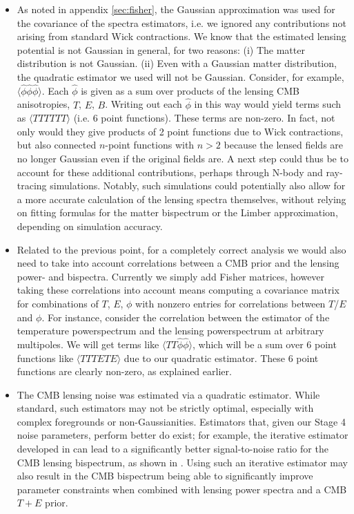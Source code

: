 \documentclass[11pt]{article} %
\begin{document}
\begin{itemize}
     \item As noted in appendix \ref{sec:fisher}, the Gaussian approximation was used for the covariance of the spectra estimators, i.e. we ignored any contributions not arising from standard Wick contractions. We know that the estimated lensing potential is not Gaussian in general, for two reasons: (i) The matter distribution is not Gaussian. (ii) Even with a Gaussian matter distribution, the quadratic estimator we used will not be Gaussian. Consider, for example, $\langle \hat \phi \hat \phi \hat \phi \rangle$. Each $\hat \phi$ is given as a sum over products of the lensing CMB anisotropies, $T$, $E$, $B$. Writing out each $\hat \phi$ in this way would yield terms such as $\langle TTTTTT\rangle$ (i.e. 6 point functions). These terms are non-zero. In fact, not only would they give products of 2 point functions due to Wick contractions, but also connected $n$-point functions with $n>2$ because the lensed fields are no longer Gaussian even if the original fields are. A next step could thus be to account for these additional contributions, perhaps through N-body and ray-tracing simulations. Notably, such simulations could potentially also allow for a more accurate calculation of the lensing spectra themselves, without relying on fitting formulas for the matter bispectrum or the Limber approximation, depending on simulation accuracy.

     \item Related to the previous point, for a completely correct analysis we would also need to take into account correlations between a CMB prior and the lensing power- and bispectra. Currently we simply add Fisher matrices, however taking these correlations into account means computing a covariance matrix for combinations of $T$, $E$, $\phi$ with nonzero entries for correlations between $T$/$E$ and $\phi$. For instance, consider the correlation between the estimator of the temperature powerspectrum and the lensing powerspectrum at arbitrary multipoles. We will get terms like $\langle TT\hat\phi\hat\phi \rangle$, which will be a sum over 6 point functions like $\langle TT TETE\rangle$ due to our quadratic estimator. These 6 point functions are clearly non-zero, as explained earlier.

    \item The CMB lensing noise was estimated via a quadratic estimator. While standard, such estimators may not be strictly optimal, especially with complex foregrounds or non-Gaussianities. Estimators that, given our Stage 4 noise parameters, perform better do exist; for example, the iterative estimator developed in \cite{Smith_2012} can lead to a significantly better signal-to-noise ratio for the CMB lensing bispectrum, as shown in \cite{Namikawa_2016}. Using such an iterative estimator may also result in the CMB bispectrum being able to significantly improve parameter constraints when combined with lensing power spectra and a CMB $T+E$ prior.


\end{itemize}
\end{document}
